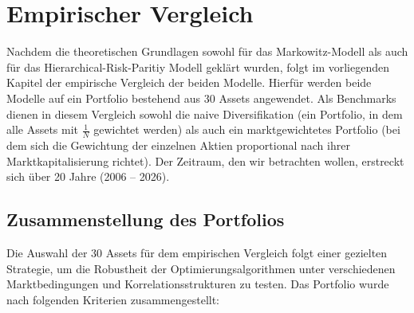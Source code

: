 \documentclass[parskip=half]{scrartcl}
\begin{document}
	\clearpage
	
	\section{Empirischer Vergleich}
	
	Nachdem die theoretischen Grundlagen sowohl für das Markowitz-Modell als auch für das Hierarchical-Risk-Paritiy Modell geklärt wurden, folgt im vorliegenden Kapitel der empirische Vergleich der beiden Modelle. Hierfür werden beide Modelle auf ein Portfolio bestehend aus 30 Assets angewendet. Als Benchmarks dienen in diesem Vergleich sowohl die naive Diversifikation (ein Portfolio, in dem alle Assets mit $\frac{1}{N}$ gewichtet werden) als auch ein marktgewichtetes Portfolio (bei dem sich die Gewichtung der einzelnen Aktien proportional nach ihrer Marktkapitalisierung richtet). Der Zeitraum, den wir betrachten wollen, erstreckt sich über 20 Jahre (2006 – 2026).
	
	\subsection{Zusammenstellung des Portfolios}
	
	Die Auswahl der 30 Assets für dem empirischen Vergleich folgt einer gezielten Strategie, um die Robustheit der Optimierungsalgorithmen unter verschiedenen Marktbedingungen und Korrelationsstrukturen zu testen. Das Portfolio wurde nach folgenden Kriterien zusammengestellt:
	
\end{document}
